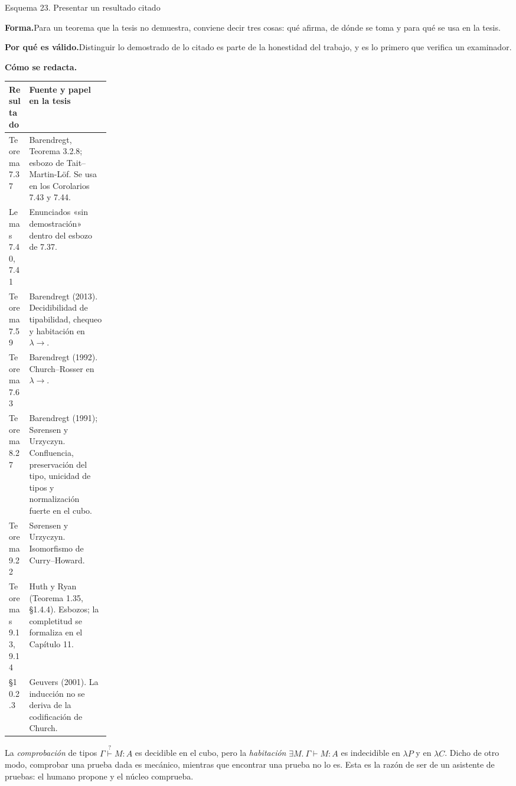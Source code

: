 \documentclass[11pt,a4paper]{article}
\newcommand{\forma}{\par\noindent\textbf{Forma.}\enspace}
\newcommand{\porque}{\par\smallskip\noindent\textbf{Por qué es válido.}\enspace}
\newcommand{\plantilla}{\par\smallskip\noindent\textbf{Cómo se redacta.}\enspace}
\begin{document}
\begin{esquema}{Esquema 23. Presentar un resultado citado}
\forma Para un teorema que la tesis no demuestra, conviene decir tres cosas:
qué afirma, de dónde se toma y para qué se usa en la tesis.

\porque Distinguir lo demostrado de lo citado es parte de la honestidad del
trabajo, y es lo primero que verifica un examinador.

\plantilla
\begin{center}
\begin{tabularx}{\linewidth}{@{}p{0.2\linewidth}X@{}}
\toprule
\textbf{Resultado} & \textbf{Fuente y papel en la tesis}\\
\midrule
Teorema 7.37 & Barendregt, Teorema 3.2.8; esbozo de Tait--Martin-Löf. Se usa en
los Corolarios 7.43 y 7.44.\\
Lemas 7.40, 7.41 & Enunciados «sin demostración» dentro del esbozo de 7.37.\\
Teorema 7.59 & Barendregt (2013). Decidibilidad de tipabilidad, chequeo y
habitación en \(\lambda\!\to\).\\
Teorema 7.63 & Barendregt (1992). Church--Rosser en \(\lambda\!\to\).\\
Teorema 8.27 & Barendregt (1991); Sørensen y Urzyczyn. Confluencia,
preservación del tipo, unicidad de tipos y normalización fuerte en el cubo.\\
Teorema 9.22 & Sørensen y Urzyczyn. Isomorfismo de Curry--Howard.\\
Teoremas 9.13, 9.14 & Huth y Ryan (Teorema 1.35, §1.4.4). Esbozos; la
completitud se formaliza en el Capítulo 11.\\
§10.2.3 & Geuvers (2001). La inducción no se deriva de la codificación de
Church.\\
\bottomrule
\end{tabularx}
\end{center}
\end{esquema}

\begin{nota}
La \emph{comprobación} de tipos \(\Gamma\overset{?}{\vdash}M:A\) es decidible
en el cubo, pero la \emph{habitación} \(\exists M.\ \Gamma\vdash M:A\) es
indecidible en \(\lambda P\) y en \(\lambda C\). Dicho de otro modo,
comprobar una prueba dada es mecánico, mientras que encontrar una prueba no lo
es. Esta es la razón de ser de un asistente de pruebas: el humano propone y el
núcleo comprueba.
\end{nota}
\end{document}
